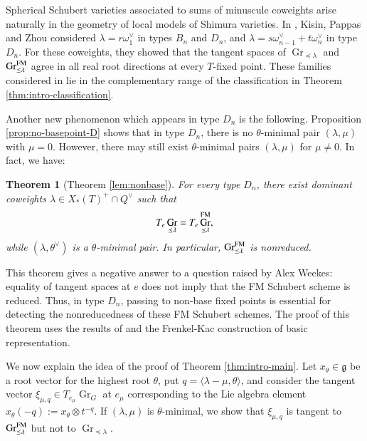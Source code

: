 \documentclass[a4paper, 12pt]{amsart}
\newtheorem{introtheorem}[introconjecture]{Theorem}
\theoremstyle{definition}
\newcommand{\g}{\mathfrak g}
\DeclareMathOperator{\Gr}{\mathrm{Gr}}
\begin{document}
Spherical Schubert varieties associated to sums of minuscule coweights arise naturally in the geometry of local models of Shimura varieties.
In \cite[Theorem~4.2.3]{KPZ}, Kisin, Pappas and Zhou considered
$\lambda=r\omega_1^\vee$ in types $B_n$ and $D_n$, and
$\lambda=s\omega_{n-1}^\vee+t\omega_n^\vee$ in type $D_n$.
For these coweights, they showed that the tangent spaces of
$\Gr_{\preceq\lambda}$ and $\Gr^{\rm FM}_{\preceq\lambda}$
agree in all real root directions at every $T$-fixed point.
These families considered in \cite{KPZ} lie in the complementary range of the classification in Theorem \ref{thm:intro-classification}.
\vspace{1mm}



Another new phenomenon which appears in type $D_n$ is the following. Proposition \ref{prop:no-basepoint-D} shows that in type $D_n$, there is no $\theta$-minimal pair $(\lambda, \mu)$ with $\mu=0$. However, there may still exist $\theta$-minimal pairs $(\lambda, \mu)$ for $\mu \neq 0$. In fact, we have:
\begin{samepage}
\begin{introtheorem}[Theorem \ref{lem:nonbase}]
For every type \(D_n\), there exist dominant coweights $\lambda\in X_*(T)^+\cap Q^\vee$ such that
\[
T_e\Gr_{\preceq\lambda}
=
T_e\Gr^{\rm FM}_{\preceq\lambda},
\]
while $(\lambda, \theta^\vee)$ is a $\theta$-minimal pair. In particular,  \(\Gr^{\rm FM}_{\preceq\lambda}\) is nonreduced.
\end{introtheorem}
\end{samepage}
 This theorem gives a negative answer to a question raised by Alex Weekes: equality of tangent spaces at $e$ does not  imply that the FM Schubert scheme is reduced.  Thus, in type \(D_n\), passing to non-base fixed points is essential for detecting the nonreducedness of these FM Schubert schemes. The proof of this theorem uses the results of \cite{BHY}
and the Frenkel-Kac construction of basic representation. 

\vspace{2mm}
We now explain the idea of the proof of Theorem \ref{thm:intro-main}. Let $x_\theta\in\g$ be a root vector for the highest
root $\theta$, put $q=\langle\lambda-\mu,\theta\rangle$, and consider the
tangent vector $\xi_{\mu,q}\in T_{e_\mu}\Gr_G$ at $e_\mu$ corresponding to the Lie algebra element $x_\theta(-q):=x_\theta\otimes t^{-q}$. If $(\lambda, \mu)$ is $\theta$-minimal,
we show that $\xi_{\mu,q}$ is tangent to $\Gr^{\rm FM}_{\preceq\lambda}$ but not to
$\Gr_{\preceq\lambda}$. 
\end{document}
